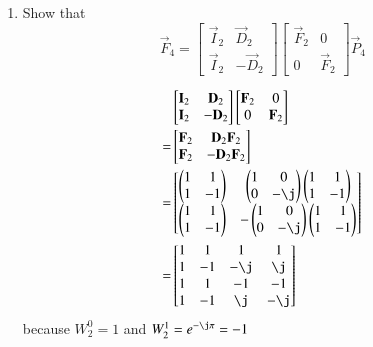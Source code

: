\documentclass[journal,12pt,twocolumn]{IEEEtran}
\newcommand{\myvec}[1]{\ensuremath{\begin{pmatrix}#1\end{pmatrix}}}
\newcommand{\mymat}[1]{\ensuremath{\begin{bmatrix}#1\end{bmatrix}}}
\renewcommand\thesection{\arabic{section}}
\begin{document}
\begin{enumerate}[label=\thesection.\arabic*]
\item Show that 
\begin{equation}
\vec{F}_{4}=
\begin{bmatrix}
\vec{I}_{2} & \vec{D}_{2} \\
\vec{I}_{2} & -\vec{D}_{2}
\end{bmatrix}
\begin{bmatrix}
\vec{F}_{2} & 0 \\
0 & \vec{F}_{2}
\end{bmatrix}
\vec{P}_{4}
\end{equation}

\solution
\begin{align}
	&\mymat{\vec{I}_2 & \vec{D}_2 \\ \vec{I}_2 & -\vec{D}_2} \mymat{\vec{F}_2 & 0 \\ 0 & \vec{F}_2} \\
	= &\mymat{\vec{F}_2 & \vec{D}_2\vec{F}_2 \\ \vec{F}_2 & -\vec{D}_2\vec{F}_2}  \\
	= &\mymat{\myvec{1&1\\1&-1} & \myvec{1&0\\0&-\j}\myvec{1&1\\1&-1} \\ \myvec{1&1\\1&-1} & - \myvec{1&0\\0&-\j}\myvec{1&1\\1&-1}} \\
	= &\mymat{1 & 1 & 1 & 1 \\ 1 & -1 & -\j & \j \\ 1 & 1 & -1 & -1 \\ 1 & -1 & \j & -\j}
\end{align}		
because $W_2^0 = 1$ and $W_2^1 = e^{-\j\pi} = -1$


\end{enumerate}
\end{document}
